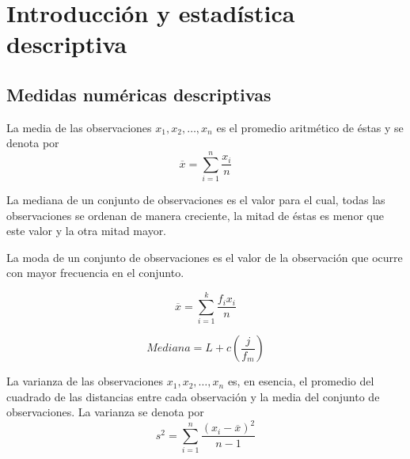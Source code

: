 \chapter{Introducción y estadística descriptiva}

\setcounter{section}{2}
\section{Medidas numéricas descriptivas}

\begin{tcolorbox}[colframe=white]
    \begin{def.} La media de las observaciones $x_1,x_2,\ldots , x_n$ es el promedio aritmético de éstas y se denota por 
	\begin{equation}
	    \overline{x} = \sum_{i=1}^{n} \dfrac{x_i}{n}
	\end{equation}
    \end{def.}
\end{tcolorbox}

\begin{tcolorbox}[colframe=white]
    \begin{def.} La mediana de un conjunto de observaciones es el valor para el cual, todas las observaciones se ordenan de manera creciente, la mitad de éstas es menor que este valor y la otra mitad mayor.
    \end{def.}
\end{tcolorbox}

\begin{tcolorbox}[colframe=white]
    \begin{def.} La moda de un conjunto de observaciones es el valor de la observación que ocurre con mayor frecuencia en el conjunto.
    \end{def.}
\end{tcolorbox}

    \begin{equation}
	\overline{x} = \sum_{i=1}^{k} \dfrac{f_i x_i}{n}
    \end{equation}

    \begin{equation}
	Mediana = L + c\left( \dfrac{j}{f_m}\right)
    \end{equation}

\begin{tcolorbox}[colframe=white]
    \begin{def.} La varianza de las observaciones $x_1,x_2,\ldots , x_n$ es, en esencia, el promedio del cuadrado de las distancias entre cada observación y la media del conjunto de observaciones. La varianza se denota por 
	\begin{equation}
	    s^2 = \sum_{i=1}^{n} \dfrac{(x_i - \overline{x})^2}{n-1}
	\end{equation}
    \end{def.}
\end{tcolorbox}

